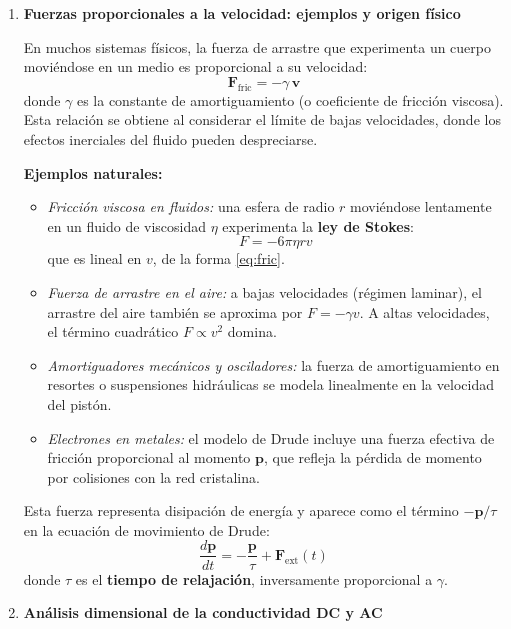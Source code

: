 \documentclass{article}
\begin{document}
\begin{enumerate}[label=\textbf{Actividad \arabic*.}, leftmargin=*]

\item \textbf{Fuerzas proporcionales a la velocidad: ejemplos y origen físico}

En muchos sistemas físicos, la fuerza de arrastre que experimenta un cuerpo moviéndose en un medio es proporcional a su velocidad:
\begin{equation}
\boxed{\mathbf{F}_{\mathrm{fric}} = -\gamma\,\mathbf{v}}
\label{eq:fric}
\end{equation}
donde \(\gamma\) es la constante de amortiguamiento (o coeficiente de fricción viscosa).
Esta relación se obtiene al considerar el límite de bajas velocidades, donde los efectos inerciales del fluido pueden despreciarse.

\medskip
\textbf{Ejemplos naturales:}
\begin{itemize}
    \item \emph{Fricción viscosa en fluidos:} una esfera de radio \(r\) moviéndose lentamente en un fluido de viscosidad \(\eta\) experimenta la \textbf{ley de Stokes}:
    \[
    F = -6\pi \eta r v
    \]
    que es lineal en \(v\), de la forma \eqref{eq:fric}.
    \item \emph{Fuerza de arrastre en el aire:} a bajas velocidades (régimen laminar), el arrastre del aire también se aproxima por \(F = -\gamma v\). A altas velocidades, el término cuadrático \(F \propto v^2\) domina.
    \item \emph{Amortiguadores mecánicos y osciladores:} la fuerza de amortiguamiento en resortes o suspensiones hidráulicas se modela linealmente en la velocidad del pistón.
    \item \emph{Electrones en metales:} el modelo de Drude incluye una fuerza efectiva de fricción proporcional al momento \( \mathbf{p} \), que refleja la pérdida de momento por colisiones con la red cristalina.
\end{itemize}

Esta fuerza representa disipación de energía y aparece como el término
\(-\mathbf{p}/\tau\) en la ecuación de movimiento de Drude:
\[
\frac{d\mathbf{p}}{dt} = -\frac{\mathbf{p}}{\tau} + \mathbf{F}_{\mathrm{ext}}(t)
\]
donde \(\tau\) es el \textbf{tiempo de relajación}, inversamente proporcional a \(\gamma\).

\item \textbf{Análisis dimensional de la conductividad DC y AC}


\end{enumerate}
\end{document}
